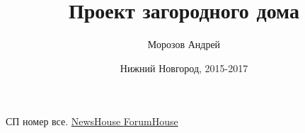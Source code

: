 \documentclass[12pt, twocolumn]{report}
\title{\textbf{\Huge{Проект загородного дома}}}
\author{ Морозов Андрей }
\date{Нижний Новгород, 2015-2017}
\begin{document}
\maketitle

\tableofcontents






















\newpage
\begin{thebibliography}{999}
	 СП номер все. 
	  \href{http://www.newshouse.ru}{\small NewsHouse }
	 \href{http://www.forumhouse.tv}{\small ForumHouse }
\end{thebibliography}


\end{document}
